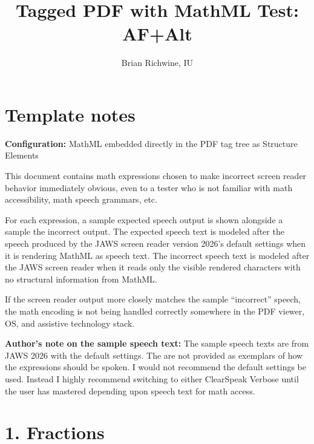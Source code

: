 \documentclass{article}
\title{Tagged PDF with MathML Test: AF+Alt}
\author{Brian Richwine, IU}
\date{}
\begin{document}
\raggedright

\maketitle

\section*{Template notes}

\textbf{Configuration:} MathML embedded directly in the PDF tag tree as Structure Elements


This document contains math expressions chosen to make incorrect screen 
reader behavior immediately obvious, even to a tester who is not familiar 
with math accessibility, math speech grammars, etc. 

For each expression, a sample expected speech output is shown alongside 
a sample the incorrect output. The expected speech text is modeled after 
the speech produced by the JAWS screen reader version 2026's default 
settings when it is rendering MathML as speech text. The incorrect speech 
text is modeled after the JAWS screen reader when it reads only the visible 
rendered characters with no structural information from MathML. 

If the screen reader output more closely matches the sample ``incorrect'' 
speech, the math encoding is not being handled correctly somewhere in 
the PDF viewer, OS, and assistive technology stack. 

\textbf{Author's note on the sample speech text:} The sample speech texts 
are from JAWS 2026 with the default settings. The are not provided as 
exemplars of how the expressions should be spoken. I would not recommend 
the default settings be used. Instead I highly recommend switching to 
either ClearSpeak Verbose until the user has mastered depending upon speech 
text for math access. 

\section*{1. Fractions}
\end{document}
